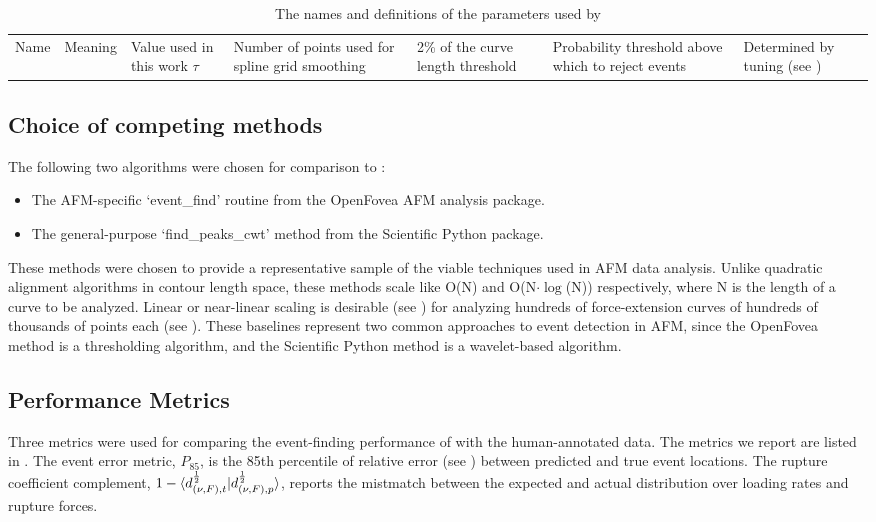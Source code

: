 \begin{table}
\caption[Algorithm parameters]{ The names and definitions of the parameters used by \name{}}
\begin{tabularx}{\textwidth}{ l | l | l | l  }
\hline \hline
Name & Meaning  & Value used in this work \e
$\tau$ & Number of points used for spline grid smoothing & 2\% of the curve length \e
threshold & Probability threshold above which to reject events  & Determined by tuning (see ) \e
\end{tabularx}
\end{table}


\subsection{Choice of competing methods}

The following two algorithms were chosen for comparison to \name{}: 

\begin{itemize}
\item The AFM-specific `event\_find' routine from the OpenFovea AFM analysis package.
\item The general-purpose `find\_peaks\_cwt' method from the Scientific Python package.
\end{itemize}

 These methods were chosen to provide a representative sample of the viable techniques used in AFM data analysis. Unlike quadratic alignment algorithms in contour length space, these methods scale like O(N) and O(N$\cdot\log$(N)) respectively, where N is the length of a curve to be analyzed. Linear or near-linear scaling is desirable (see ) for analyzing hundreds of force-extension curves of hundreds of thousands of points each (see ). These baselines represent two common approaches to event detection in AFM, since the OpenFovea method is a thresholding algorithm, and the Scientific Python method is a wavelet-based algorithm. 

\subsection{Performance Metrics}

Three metrics were used for comparing the event-finding performance of \name{} with the human-annotated data. The metrics we report are listed in . The event error metric, $P_{85}$, is the 85th percentile of relative error (see ) between predicted and true event locations.  The rupture \bc{} coefficient complement, $1-\braket{d_{(\nu,F),t}^{\frac{1}{2}}|d_{(\nu,F),p}^{\frac{1}{2}}}$, reports the mistmatch between the expected and actual distribution over loading rates and rupture forces. 


